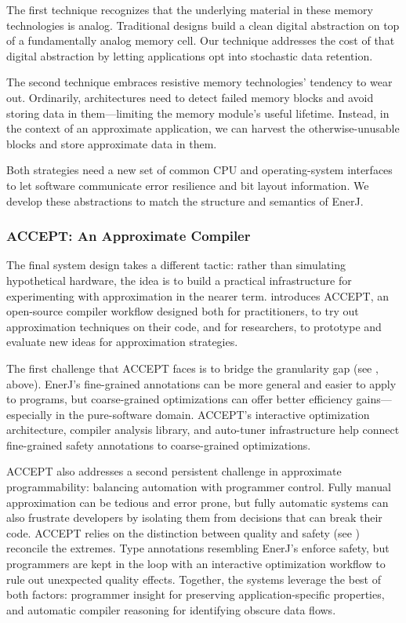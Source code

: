 The first technique recognizes that the underlying material in these memory
technologies is analog.
Traditional designs build a clean digital abstraction on top of a
fundamentally analog memory cell.
Our technique addresses the cost of that digital abstraction by letting
applications opt into stochastic data retention.

The second technique embraces resistive memory technologies' tendency to wear
out.
Ordinarily, architectures need to detect failed memory blocks and avoid
storing data in them---limiting the memory module's useful lifetime.
Instead, in the context of an approximate application, we can harvest the otherwise-unusable
blocks and store approximate data in them.

Both strategies need a new set of common CPU and operating-system interfaces
to let software communicate error resilience and bit layout information.
We develop these abstractions to match the structure and semantics of EnerJ.

\subsubsection{ACCEPT: An Approximate Compiler}

The final system design takes a different tactic:
rather than simulating hypothetical hardware,
the idea is to build a practical infrastructure for experimenting with
approximation in the nearer term.
 introduces ACCEPT, an open-source compiler workflow designed both for
practitioners, to try out approximation techniques on their code,
and for researchers, to prototype and evaluate new ideas for approximation
strategies.

The first challenge that ACCEPT faces is to bridge the granularity gap (see
, above).
EnerJ's fine-grained annotations can be more general and easier to apply to
programs,
but coarse-grained optimizations can offer better efficiency
gains---especially in the pure-software domain.
ACCEPT's interactive optimization architecture,
compiler analysis library,
and auto-tuner infrastructure help connect fine-grained safety annotations to
coarse-grained optimizations.

ACCEPT also addresses a second persistent challenge in approximate
programmability:
balancing automation with programmer control.
Fully manual approximation can be tedious and error prone,
but fully automatic systems can also frustrate developers by isolating them
from decisions that can break their code.
ACCEPT relies on the distinction between quality and safety (see
) reconcile the extremes.
Type annotations resembling EnerJ's enforce safety, but programmers are kept
in the loop with an interactive optimization workflow to rule out unexpected
quality effects.
Together, the systems leverage the best of both factors:
programmer insight for preserving application-specific properties,
and automatic compiler reasoning for identifying obscure data flows.

